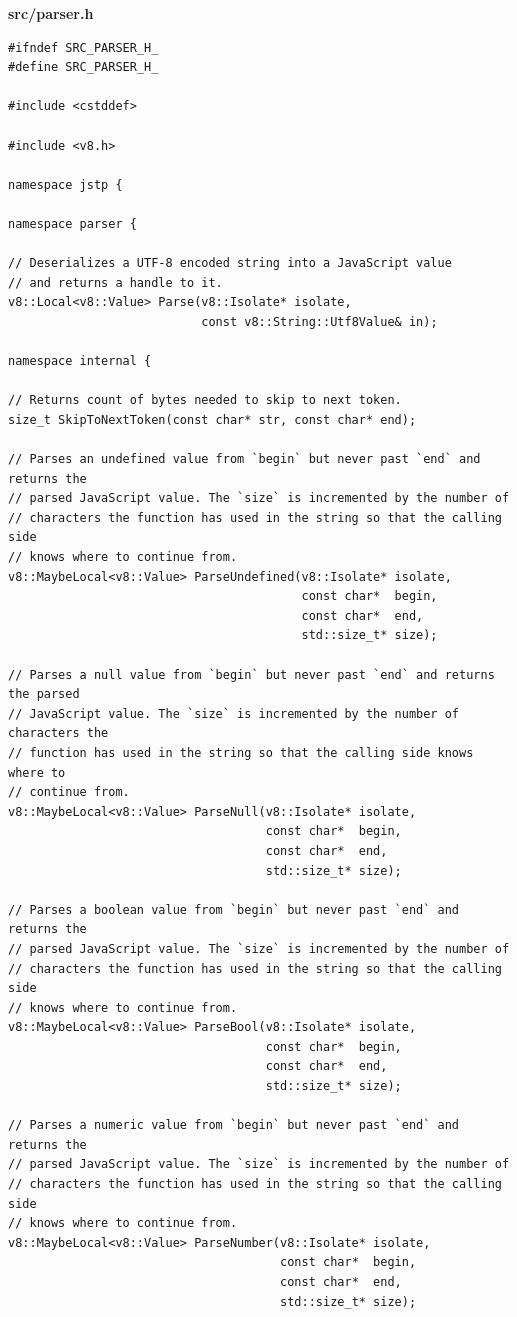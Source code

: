 \documentclass[%
  ukrainian, utf8, columnvii, simple,
  hpadding=10mm, vpadding=10mm, reduceheight=2mm,
  floatsection,
]{eskdtext}
\begin{document}
\textbf{src/parser.h}

\begin{verbatim}
#ifndef SRC_PARSER_H_
#define SRC_PARSER_H_

#include <cstddef>

#include <v8.h>

namespace jstp {

namespace parser {

// Deserializes a UTF-8 encoded string into a JavaScript value
// and returns a handle to it.
v8::Local<v8::Value> Parse(v8::Isolate* isolate,
                           const v8::String::Utf8Value& in);

namespace internal {

// Returns count of bytes needed to skip to next token.
size_t SkipToNextToken(const char* str, const char* end);

// Parses an undefined value from `begin` but never past `end` and returns the
// parsed JavaScript value. The `size` is incremented by the number of
// characters the function has used in the string so that the calling side
// knows where to continue from.
v8::MaybeLocal<v8::Value> ParseUndefined(v8::Isolate* isolate,
                                         const char*  begin,
                                         const char*  end,
                                         std::size_t* size);

// Parses a null value from `begin` but never past `end` and returns the parsed
// JavaScript value. The `size` is incremented by the number of characters the
// function has used in the string so that the calling side knows where to
// continue from.
v8::MaybeLocal<v8::Value> ParseNull(v8::Isolate* isolate,
                                    const char*  begin,
                                    const char*  end,
                                    std::size_t* size);

// Parses a boolean value from `begin` but never past `end` and returns the
// parsed JavaScript value. The `size` is incremented by the number of
// characters the function has used in the string so that the calling side
// knows where to continue from.
v8::MaybeLocal<v8::Value> ParseBool(v8::Isolate* isolate,
                                    const char*  begin,
                                    const char*  end,
                                    std::size_t* size);

// Parses a numeric value from `begin` but never past `end` and returns the
// parsed JavaScript value. The `size` is incremented by the number of
// characters the function has used in the string so that the calling side
// knows where to continue from.
v8::MaybeLocal<v8::Value> ParseNumber(v8::Isolate* isolate,
                                      const char*  begin,
                                      const char*  end,
                                      std::size_t* size);


\end{verbatim}
\end{document}
